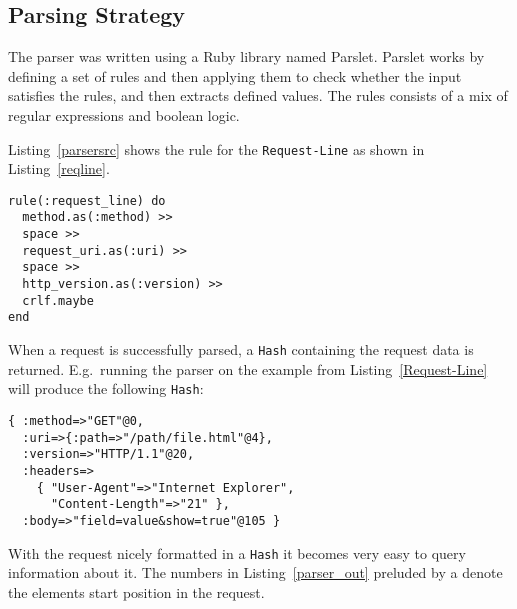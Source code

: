\subsection{Parsing Strategy}
The parser was written using a Ruby library named Parslet. Parslet works by
defining a set of rules and then applying them to check whether the input
satisfies the rules, and then extracts defined values. The rules consists of a
mix of regular expressions and boolean logic.

Listing~\ref{parsersrc} shows the rule for the \texttt{Request-Line} as shown
in Listing~\ref{reqline}.

\bigskip
\begin{lstlisting}[label=parsersrc]
rule(:request_line) do 
  method.as(:method) >> 
  space >> 
  request_uri.as(:uri) >> 
  space >> 
  http_version.as(:version) >> 
  crlf.maybe 
end
\end{lstlisting}

When a request is successfully parsed, a \texttt{Hash} containing the request
data is returned. E.g.\ running the parser on the example from
Listing~\ref{Request-Line} will produce the following \texttt{Hash}:

\bigskip
\begin{lstlisting}[label=parser_out,caption=Example \texttt{Parser} output]
{ :method=>"GET"@0,
  :uri=>{:path=>"/path/file.html"@4},
  :version=>"HTTP/1.1"@20,
  :headers=>
    { "User-Agent"=>"Internet Explorer",
      "Content-Length"=>"21" },
  :body=>"field=value&show=true"@105 }
\end{lstlisting}

With the request nicely formatted in a \texttt{Hash} it becomes very easy to
query information about it. The numbers in Listing~\ref{parser_out} preluded
by a \@ denote the elements start position in the request.

